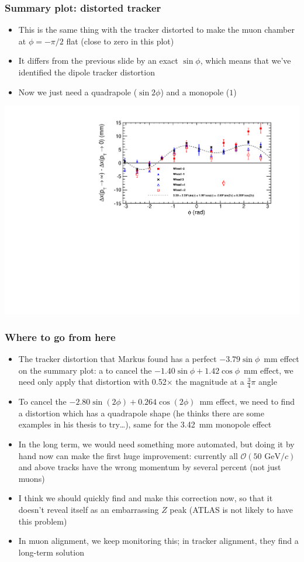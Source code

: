 \documentclass[compress]{beamer}
\begin{document}
\begin{frame}
\frametitle{Summary plot: distorted tracker}

\begin{itemize}
\item This is the same thing with the tracker distorted to make the muon chamber at $\phi=-\pi/2$ flat (close to zero in this plot)
\item It differs from the previous slide by an exact $\sin\phi$, which means that we've identified the dipole tracker distortion
\item Now we just need a quadrapole ($\sin 2\phi$) and a monopole ($1$)
\end{itemize}

\includegraphics[width=\linewidth]{summary_threekappas.pdf}
\end{frame}

\begin{frame}
\frametitle{Where to go from here}
\begin{itemize}
\item The tracker distortion that Markus found has a perfect $-3.79
  \sin\phi$~mm effect on the summary plot: a to cancel the $-1.40\sin\phi
  + 1.42\cos\phi$~mm effect, we need only apply that distortion with
  0.52$\times$ the magnitude at a $\frac{3}{4}\pi$ angle
\item To cancel the $-2.80 \sin(2\phi) + 0.264 \cos(2\phi)$~mm effect,
  we need to find a distortion which has a quadrapole shape (he thinks
  there are some examples in his thesis to try\ldots), same for the
  3.42~mm monopole effect
\item In the long term, we would need something more automated, but
  doing it by hand now can make the first huge improvement: currently
  all $\mathcal{O}(50\mbox{ GeV/}c)$ and above tracks have the wrong
  momentum by several percent (not just muons)
\item I think we should quickly find and make this correction now, so
  that it doesn't reveal itself as an embarrassing $Z$ peak (ATLAS is
  not likely to have this problem)
\item In muon alignment, we keep monitoring this; in tracker
  alignment, they find a long-term solution
\end{itemize}

\label{numpages}
\end{frame}
\end{document}
